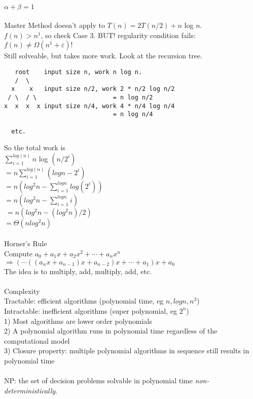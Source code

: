\documentclass[8pt,letterpaper,twocolumn]{article}
\begin{document}
\\
\textbullet $\alpha + \beta = 1$\\
\\
\textbullet Master Method doesn't apply to $T(n) = 2T(n/2) + n$ log $n$.\\
$f(n) > n^1$, so check Case 3. BUT! regularity condition fails: $f(n) \neq \Omega(n^1+\varepsilon)!$\\
Still solveable, but takes more work. Look at the recursion tree.
\begin{verbatim}   
   root    input size n, work n log n.
   /  \
  x    x   input size n/2, work 2 * n/2 log n/2
 / \  / \                     = n log n/2
x  x  x  x input size n/4, work 4 * n/4 log n/4
                              = n log n/4 

  etc.
\end{verbatim}
So the total work is\\
$\sum_{i=1}^{log(n)} n$ log $(n/2^i)$\\
$    = n \sum_{i=1}^{log(n)} (log n - 2^i)$\\
$    = n (log^2 n - \sum_{i=1}^{logn} log(2^i))$\\
$    = n (log^2 n - \sum_{i=1}^{logn} i)$\\
$   ~= n (log^2 n - (log^2 n)/2)$\\
$    = \Theta(n log^2 n)$\\
\\
\textbullet Horner's Rule\\
Compute $a_0+a_1x+a_2x^2+\cdots+a_nx^n$\\
$\Rightarrow (\cdots((a_nx+a_{n-1})x+a_{n-2})x+\cdots+a_1)x+a_0$\\
The idea is to multiply, add, multiply, add, etc.\\
\\
\textbullet Complexity\\
Tractable: efficient algorithms (polynomial time, eg $n, logn, n^3$)\\
Intractable: inefficient algorithms (super polynomial, eg $2^n$)\\
1) Most algorithms are lower order polynomials\\
2) A polynomial algorithm runs in polynomial time regardless of the computational model\\
3) Closure property: multiple polynomial algorithms in sequence still results in polynomial time\\
\\
\textbullet NP: the set of decision problems solvable in polynomial time \emph{non-deterministically}.\\
\end{document}
